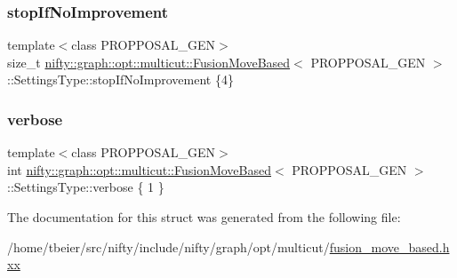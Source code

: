 \subsubsection{\texorpdfstring{stop\+If\+No\+Improvement}{stopIfNoImprovement}}
{\footnotesize\ttfamily template$<$class P\+R\+O\+P\+P\+O\+S\+A\+L\+\_\+\+G\+EN$>$ \\
size\+\_\+t \hyperlink{classnifty_1_1graph_1_1opt_1_1multicut_1_1FusionMoveBased}{nifty\+::graph\+::opt\+::multicut\+::\+Fusion\+Move\+Based}$<$ P\+R\+O\+P\+P\+O\+S\+A\+L\+\_\+\+G\+EN $>$\+::Settings\+Type\+::stop\+If\+No\+Improvement \{4\}}

\mbox{\label{structnifty_1_1graph_1_1opt_1_1multicut_1_1FusionMoveBased_1_1SettingsType_ab1028a44657276da660e87bf7f5ddd3b}} 
\subsubsection{\texorpdfstring{verbose}{verbose}}
{\footnotesize\ttfamily template$<$class P\+R\+O\+P\+P\+O\+S\+A\+L\+\_\+\+G\+EN$>$ \\
int \hyperlink{classnifty_1_1graph_1_1opt_1_1multicut_1_1FusionMoveBased}{nifty\+::graph\+::opt\+::multicut\+::\+Fusion\+Move\+Based}$<$ P\+R\+O\+P\+P\+O\+S\+A\+L\+\_\+\+G\+EN $>$\+::Settings\+Type\+::verbose \{ 1 \}}



The documentation for this struct was generated from the following file\+:\begin{DoxyCompactItemize}
\item 
/home/tbeier/src/nifty/include/nifty/graph/opt/multicut/\hyperlink{multicut_2fusion__move__based_8hxx}{fusion\+\_\+move\+\_\+based.\+hxx}\end{DoxyCompactItemize}
